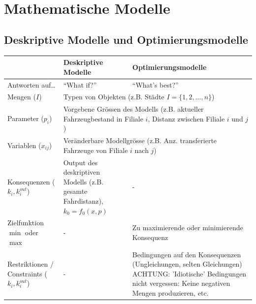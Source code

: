 \section{Mathematische Modelle }
\subsection{Deskriptive Modelle und Optimierungsmodelle }
  \begin{tabular}{|p{3.7cm}|p{7cm}|p{7cm}|}
    \hline
    & \textbf{Deskriptive Modelle}
    & \textbf{Optimierungsmodelle} \\
    \hline
    \hline
    Antworten auf\ldots
      & ``What if?''
      & ``What's best?'' \\
    \hline
    Mengen ($I$)
      & \multicolumn{2}{l|}{Typen von Objekten (z.B. Städte $I = \{1,2,\ldots,n\}$)} \\
    \hline
    Parameter ($p_i$)
      & \multicolumn{2}{p{14cm}|}{Vorgebene Grössen des Modells (z.B. aktueller Fahrzeugbestand in Filiale $i$, Distanz zwischen Filiale $i$ und $j$)} \\
    \hline
    Variablen ($x_{ij}$)
      & \multicolumn{2}{l|}{Veränderbare Modellgrösse (z.B. Anz. transferierte Fahrzeuge von Filiale $i$ nach $j$)} \\
    \hline
    Konsequenzen ($k_{i}, k_i^{out}$)
      & Output des deskriptiven Modells (z.B. gesamte Fahrdistanz), $k_0 = f_0(x,p)$ 
      & -\\
    \hline
    Zielfunktion $\min$ oder $\max$
      & - 
      & Zu maximierende oder minimierende Konsequenz\\
    \hline
    Restriktionen / Constraints ($k_{i}, k_i^{out}$)
      & - 
      & Bedingungen auf den Konsequenzen (Ungleichungen, selten Gleichungen) ACHTUNG: 'Idiotische' Bedingungen nicht vergessen: Keine negativen Mengen produzieren, etc.\\
    \hline
  \end{tabular}
  
